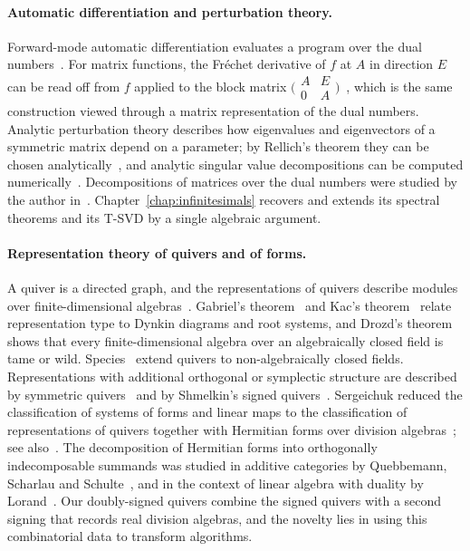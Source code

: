 \documentclass[12pt, a4paper]{report}
\theoremstyle{plain}
\theoremstyle{definition}
\theoremstyle{remark}
\theoremstyle{plain}
\begin{document}
\paragraph{Automatic differentiation and perturbation theory.}
Forward-mode automatic differentiation evaluates a program over the dual numbers~\cite{GriewankWalther2008}. For matrix functions, the Fr\'echet derivative of $f$ at $A$ in direction $E$ can be read off from $f$ applied to the block matrix $\bigl(\begin{smallmatrix}A&E\\0&A\end{smallmatrix}\bigr)$~\cite{Higham2008}, which is the same construction viewed through a matrix representation of the dual numbers. Analytic perturbation theory describes how eigenvalues and eigenvectors of a symmetric matrix depend on a parameter; by Rellich's theorem they can be chosen analytically~\cite{Kato1995}, and analytic singular value decompositions can be computed numerically~\cite{BunseGerstnerByersMehrmannNichols1991}. Decompositions of matrices over the dual numbers were studied by the author in~\cite{Gutin2022DualNumbers}. Chapter~\ref{chap:infinitesimals} recovers and extends its spectral theorems and its T-SVD by a single algebraic argument.

\paragraph{Representation theory of quivers and of forms.}
A quiver is a directed graph, and the representations of quivers describe modules over finite-dimensional algebras~\cite{AssemSimsonSkowronski2006,Schiffler2014,DerksenWeyman2017}. Gabriel's theorem~\cite{Gabriel1972} and Kac's theorem~\cite{Kac1980} relate representation type to Dynkin diagrams and root systems, and Drozd's theorem~\cite{Drozd1980} shows that every finite-dimensional algebra over an algebraically closed field is tame or wild. Species~\cite{DlabRingel1976} extend quivers to non-algebraically closed fields. Representations with additional orthogonal or symplectic structure are described by symmetric quivers~\cite{DerksenWeyman2002} and by Shmelkin's signed quivers~\cite{Shmelkin2006}. Sergeichuk reduced the classification of systems of forms and linear maps to the classification of representations of quivers together with Hermitian forms over division algebras~\cite{Sergeichuk1988}; see also~\cite{HornSergeichuk2006}. The decomposition of Hermitian forms into orthogonally indecomposable summands was studied in additive categories by Quebbemann, Scharlau and Schulte~\cite{QuebbemannScharlauSchulte1979}, and in the context of linear algebra with duality by Lorand~\cite{Lorand2020}. Our doubly-signed quivers combine the signed quivers with a second signing that records real division algebras, and the novelty lies in using this combinatorial data to transform algorithms.
\end{document}
